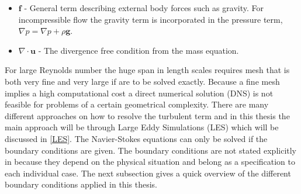 \begin{itemize}
\item $\mathbf{f}$ 
    - General term describing external body forces such as gravity. For incompressible flow the
    gravity term is incorporated in the pressure term, $\nabla p = \nabla p + \rho \mathbf{g}$. 

    \item $\nabla \cdot \mathbf{u}$ 
    - The divergence free condition from the mass equation.
\end{itemize}
For large Reynolds number the huge span in length scales requires mesh that is both very fine and very large
if  are to be solved exactly.
Because a fine mesh implies a high computational cost a direct numerical solution (DNS) is not feasible for 
problems of a certain geometrical complexity. There are many different approaches on how to resolve the turbulent term and in 
this thesis the main approach will be through Large Eddy Simulations (LES) which will be discussed 
in \cref{LES}. The Navier-Stokes equations can only be solved if the boundary conditions are given. 
The boundary conditions are not stated explicitly in  because they depend on the physical 
situation and belong as a specification to each individual case. The next subsection gives a quick overview of the different 
boundary conditions applied in this thesis.
%
